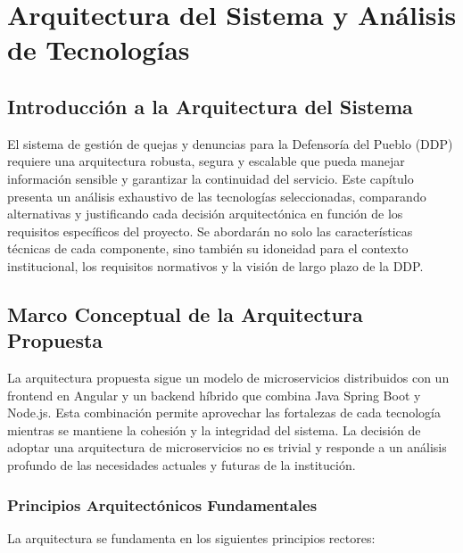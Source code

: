 \chapter{Arquitectura del Sistema y Análisis de Tecnologías}

\section{Introducción a la Arquitectura del Sistema}

El sistema de gestión de quejas y denuncias para la Defensoría del Pueblo (DDP) requiere una arquitectura robusta, segura y escalable que pueda manejar información sensible y garantizar la continuidad del servicio. Este capítulo presenta un análisis exhaustivo de las tecnologías seleccionadas, comparando alternativas y justificando cada decisión arquitectónica en función de los requisitos específicos del proyecto. Se abordarán no solo las características técnicas de cada componente, sino también su idoneidad para el contexto institucional, los requisitos normativos y la visión de largo plazo de la DDP.

\section{Marco Conceptual de la Arquitectura Propuesta}

La arquitectura propuesta sigue un modelo de microservicios distribuidos con un frontend en Angular y un backend híbrido que combina Java Spring Boot y Node.js. Esta combinación permite aprovechar las fortalezas de cada tecnología mientras se mantiene la cohesión y la integridad del sistema. La decisión de adoptar una arquitectura de microservicios no es trivial y responde a un análisis profundo de las necesidades actuales y futuras de la institución.

\subsection{Principios Arquitectónicos Fundamentales}

La arquitectura se fundamenta en los siguientes principios rectores:

